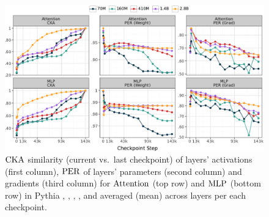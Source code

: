 \begin{figure}[h!]
    \centering
    \includegraphics[width=\linewidth]{chapters/tending-towards-stability/figures/results.pdf}
    \vspace{-15pt}
    \caption{$\mathrm{CKA}$ similarity (current vs.\ last checkpoint) of layers' activations (first column), $\mathrm{PER}$ of layers' parameters (second column) and gradients (third column) for $\mathrm{Attention}$ (top row) and $\mathrm{MLP}$ (bottom row) in Pythia \sevenmil, \sixmil, \fourmil, \onebil, and \twobil averaged (mean) across layers per each checkpoint.}
    \label{fig:main-results}
\end{figure}


